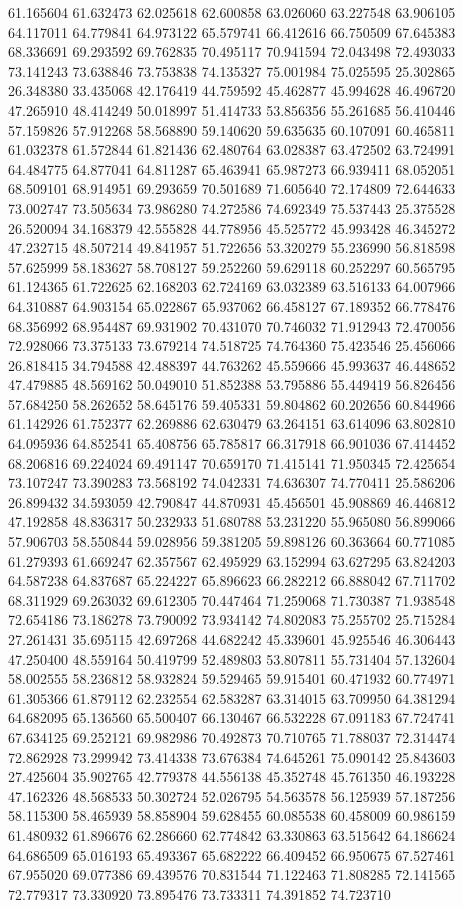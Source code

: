 61.165604
61.632473
62.025618
62.600858
63.026060
63.227548
63.906105
64.117011
64.779841
64.973122
65.579741
66.412616
66.750509
67.645383
68.336691
69.293592
69.762835
70.495117
70.941594
72.043498
72.493033
73.141243
73.638846
73.753838
74.135327
75.001984
75.025595
25.302865
26.348380
33.435068
42.176419
44.759592
45.462877
45.994628
46.496720
47.265910
48.414249
50.018997
51.414733
53.856356
55.261685
56.410446
57.159826
57.912268
58.568890
59.140620
59.635635
60.107091
60.465811
61.032378
61.572844
61.821436
62.480764
63.028387
63.472502
63.724991
64.484775
64.877041
64.811287
65.463941
65.987273
66.939411
68.052051
68.509101
68.914951
69.293659
70.501689
71.605640
72.174809
72.644633
73.002747
73.505634
73.986280
74.272586
74.692349
75.537443
25.375528
26.520094
34.168379
42.555828
44.778956
45.525772
45.993428
46.345272
47.232715
48.507214
49.841957
51.722656
53.320279
55.236990
56.818598
57.625999
58.183627
58.708127
59.252260
59.629118
60.252297
60.565795
61.124365
61.722625
62.168203
62.724169
63.032389
63.516133
64.007966
64.310887
64.903154
65.022867
65.937062
66.458127
67.189352
66.778476
68.356992
68.954487
69.931902
70.431070
70.746032
71.912943
72.470056
72.928066
73.375133
73.679214
74.518725
74.764360
75.423546
25.456066
26.818415
34.794588
42.488397
44.763262
45.559666
45.993637
46.448652
47.479885
48.569162
50.049010
51.852388
53.795886
55.449419
56.826456
57.684250
58.262652
58.645176
59.405331
59.804862
60.202656
60.844966
61.142926
61.752377
62.269886
62.630479
63.264151
63.614096
63.802810
64.095936
64.852541
65.408756
65.785817
66.317918
66.901036
67.414452
68.206816
69.224024
69.491147
70.659170
71.415141
71.950345
72.425654
73.107247
73.390283
73.568192
74.042331
74.636307
74.770411
25.586206
26.899432
34.593059
42.790847
44.870931
45.456501
45.908869
46.446812
47.192858
48.836317
50.232933
51.680788
53.231220
55.965080
56.899066
57.906703
58.550844
59.028956
59.381205
59.898126
60.363664
60.771085
61.279393
61.669247
62.357567
62.495929
63.152994
63.627295
63.824203
64.587238
64.837687
65.224227
65.896623
66.282212
66.888042
67.711702
68.311929
69.263032
69.612305
70.447464
71.259068
71.730387
71.938548
72.654186
73.186278
73.790092
73.934142
74.802083
75.255702
25.715284
27.261431
35.695115
42.697268
44.682242
45.339601
45.925546
46.306443
47.250400
48.559164
50.419799
52.489803
53.807811
55.731404
57.132604
58.002555
58.236812
58.932824
59.529465
59.915401
60.471932
60.774971
61.305366
61.879112
62.232554
62.583287
63.314015
63.709950
64.381294
64.682095
65.136560
65.500407
66.130467
66.532228
67.091183
67.724741
67.634125
69.252121
69.982986
70.492873
70.710765
71.788037
72.314474
72.862928
73.299942
73.414338
73.676384
74.645261
75.090142
25.843603
27.425604
35.902765
42.779378
44.556138
45.352748
45.761350
46.193228
47.162326
48.568533
50.302724
52.026795
54.563578
56.125939
57.187256
58.115300
58.465939
58.858904
59.628455
60.085538
60.458009
60.986159
61.480932
61.896676
62.286660
62.774842
63.330863
63.515642
64.186624
64.686509
65.016193
65.493367
65.682222
66.409452
66.950675
67.527461
67.955020
69.077386
69.439576
70.831544
71.122463
71.808285
72.141565
72.779317
73.330920
73.895476
73.733311
74.391852
74.723710
